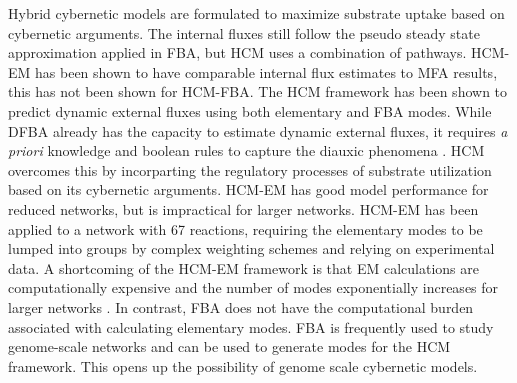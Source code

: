 \documentclass[10pt,twocolumn,twoside,final]{IEEEtran}
\begin{document}
Hybrid cybernetic models are formulated to maximize substrate uptake based on cybernetic arguments.
The internal fluxes still follow the pseudo steady state approximation applied in FBA, but HCM uses a combination of pathways.
HCM-EM has been shown to have comparable internal flux estimates to MFA results\cite{2008_kim_varner_ramkrishna_BiotechProg}, this has not been shown for HCM-FBA.
The HCM framework has been shown to predict dynamic external fluxes using both elementary and FBA modes.
While DFBA already has the capacity to estimate dynamic external fluxes, it requires \textit{a priori} knowledge and boolean rules to capture the diauxic phenomena \cite{1994_varma_palsson_ApplEnvMicro,2002_Mahadevan_BiophysJ,2001_covert_schilling_palsson}.
HCM overcomes this by incorparting the regulatory processes of substrate utilization based on its cybernetic arguments.
HCM-EM has good model performance for reduced networks, but is impractical for larger networks.
HCM-EM has been applied to a network with 67 reactions, requiring the elementary modes to be lumped into groups by complex weighting schemes and relying on experimental data\cite{2010_song_ramkrishna}.
A shortcoming of the HCM-EM framework is that EM calculations are computationally expensive and the number of modes exponentially increases for larger networks \cite{2004_lee_varner_ko_ieee}.
In contrast, FBA does not have the computational burden associated with calculating elementary modes.
FBA is frequently used to study genome-scale networks\cite{2010_orth_NatBiotech} and can be used to generate modes for the HCM framework.
This opens up the possibility of genome scale cybernetic models.

\end{document}

